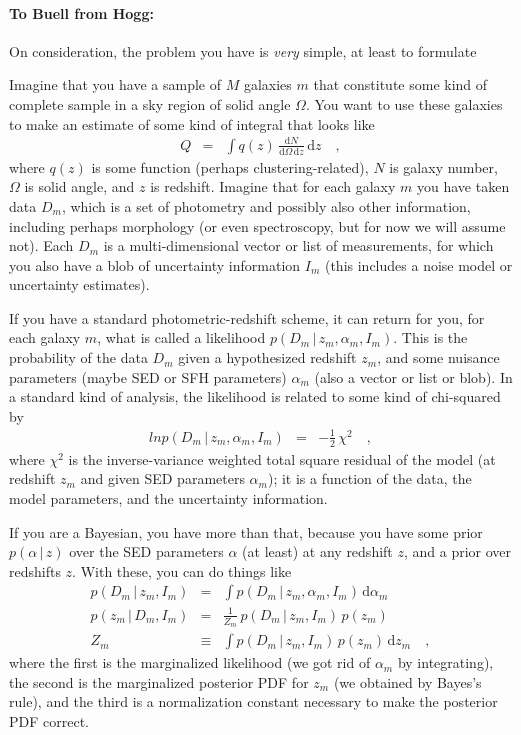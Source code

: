 \documentclass[12pt]{article}
\newcommand{\given}{\,|\,}
\newcommand{\dd}{\mathrm d}
\begin{document}
\paragraph{To Buell from Hogg:}
On consideration, the problem you have is \emph{very} simple, at least
to formulate

Imagine that you have a sample of $M$ galaxies $m$ that constitute
some kind of complete sample in a sky region of solid angle $\Omega$.
You want to use these galaxies to make an estimate of some kind of
integral that looks like
\begin{eqnarray}\displaystyle
Q &=& \int q(z)\,\frac{\dd N}{\dd \Omega\,\dd z}\,\dd z
\quad ,
\end{eqnarray}
where $q(z)$ is some function (perhaps clustering-related), $N$ is
galaxy number, $\Omega$ is solid angle, and $z$ is redshift.  Imagine
that for each galaxy $m$ you have taken data $D_m$, which is a set of
photometry and possibly also other information, including perhaps
morphology (or even spectroscopy, but for now we will assume not).
Each $D_m$ is a multi-dimensional vector or list of measurements, for
which you also have a blob of uncertainty information $I_m$ (this
includes a noise model or uncertainty estimates).

If you have a standard photometric-redshift scheme, it can return for
you, for each galaxy $m$, what is called a likelihood $p(D_m \given
z_m,\alpha_m,I_m)$.  This is the probability of the data $D_m$ given a
hypothesized redshift $z_m$, and some nuisance parameters (maybe SED
or SFH parameters) $\alpha_m$ (also a vector or list or blob).  In a
standard kind of analysis, the likelihood is related to some kind of
chi-squared by
\begin{eqnarray}
ln p(D_m \given z_m, \alpha_m, I_m) &=& -\frac{1}{2}\,\chi^2
\quad,
\end{eqnarray}
where $\chi^2$ is the inverse-variance weighted total square residual
of the model (at redshift $z_m$ and given SED parameters $\alpha_m$);
it is a function of the data, the model parameters, and the
uncertainty information.

If you are a Bayesian, you have more than that, because you have some
prior $p(\alpha \given z)$ over the SED parameters $\alpha$ (at least)
at any redshift $z$, and a prior over redshifts $z$.  With these, you
can do things like
\begin{eqnarray}
p(D_m \given z_m, I_m) &=& \int p(D_m \given z_m, \alpha_m, I_m)\,\dd \alpha_m
\\
p(z_m \given D_m, I_m) &=& \frac{1}{Z_m}\,p(D_m \given z_m, I_m)\,p(z_m)
\\
Z_m &\equiv& \int p(D_m \given z_m, I_m)\,p(z_m)\,\dd z_m
\quad ,
\end{eqnarray}
where the first is the marginalized likelihood (we got rid of
$\alpha_m$ by integrating), the second is the marginalized posterior
PDF for $z_m$ (we obtained by Bayes's rule), and the third is a
normalization constant necessary to make the posterior PDF correct.
\end{document}
